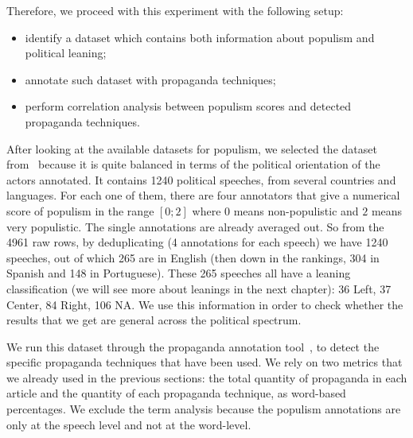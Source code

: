 
Therefore, we proceed with this experiment with the following setup:

\begin{itemize}
    \item identify a dataset which contains both information about populism and political leaning;
    \item annotate such dataset with propaganda techniques;
    \item perform correlation analysis between populism scores and detected propaganda techniques.
\end{itemize}

After looking at the available datasets for populism, we selected the dataset from~\citet{hawkins2019global} because it is quite balanced in terms of the political orientation of the actors annotated. %
It contains 1240 political speeches, from several countries and languages.
For each one of them, there are four annotators that give a numerical score of populism in the range $[0;2]$ where $0$ means non-populistic and $2$ means very populistic. The single annotations are already averaged out.
So from the 4961 raw rows, by deduplicating (4 annotations for each speech) we have 1240 speeches, out of which 265 are in English (then down in the rankings, 304 in Spanish and 148 in Portuguese).
These 265 speeches all have a leaning classification (we will see more about leanings in the next chapter): 36 Left, 37 Center, 84 Right, 106 NA. We use this information in order to check whether the results that we get are general across the political spectrum.

We run this dataset through the propaganda annotation tool~\citep{da2019fine}, to detect the specific propaganda techniques that have been used.
We rely on two metrics that we already used in the previous sections: the total quantity of propaganda in each article and the quantity of each propaganda technique, as word-based percentages. We exclude the term analysis because the populism annotations are only at the speech level and not at the word-level. %

